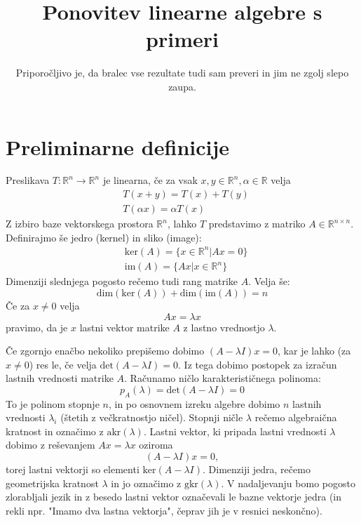 \documentclass{article}
\title{Ponovitev linearne algebre s primeri}
\date{Priporočljivo je, da bralec vse rezultate tudi sam preveri in jim ne zgolj slepo zaupa.}
\begin{document}
\maketitle
\section*{Preliminarne definicije}
Preslikava $T: \mathbb{R}^n \to \mathbb{R}^n$ je linearna, če za vsak $x,y \in \mathbb{R}^n, \alpha \in \mathbb{R}$ velja 
\begin{align*}
&T(x+y) = T(x)+T(y)\\
&T(\alpha x) = \alpha T(x)
\end{align*}
Z izbiro baze vektorskega prostora $\mathbb{R}^n$, lahko $T$ predstavimo z matriko $A \in \mathbb{R}^{n \times n}$.
Definirajmo še jedro (kernel) in sliko (image):
\begin{align*}
&\mathrm{ker}(A) = \{ x \in \mathbb{R}^n | Ax = 0\} \\
&\mathrm{im}(A) = \{ Ax | x \in \mathbb{R}^n\} 
\end{align*}
Dimenziji slednjega pogosto rečemo tudi rang matrike $A$. Velja še:
\begin{equation*}
\mathrm{dim}(\mathrm{ker}(A)) + \mathrm{dim}(\mathrm{im}(A)) = n
\end{equation*}
Če za $x \neq 0$ velja 
\begin{equation*}
Ax = \lambda x
\end{equation*}
pravimo, da je $x$ lastni vektor matrike $A$ z lastno vrednostjo $\lambda$.
\vspace{1em}

\noindent Če zgornjo enačbo nekoliko prepišemo dobimo $(A- \lambda I)x = 0$, kar je lahko (za $x \neq 0$) res le, če velja $\mathrm{det}(A - \lambda I) = 0$.
Iz tega dobimo postopek za izračun lastnih vrednosti matrike $A$. Računamo ničlo karakterističnega polinoma:
\begin{equation*}
p_A(\lambda) = \mathrm{det}(A-\lambda I) = 0
\end{equation*}
To je polinom stopnje $n$, in po osnovnem izreku algebre dobimo $n$ lastnih vrednosti $\lambda_i$ (štetih z večkratnostjo ničel).
Stopnji ničle $\lambda$ rečemo algebraična kratnost in označimo z $\mathrm{akr}(\lambda)$.
Lastni vektor, ki pripada lastni vrednosti $\lambda$ dobimo z reševanjem $Ax = \lambda x$ oziroma
\begin{equation*}
(A-\lambda I)x = 0,
\end{equation*}
torej lastni vektorji so elementi $\mathrm{ker}(A-\lambda I)$. Dimenziji jedra, rečemo geometrijska kratnost $\lambda$ in jo označimo z $\mathrm{gkr}(\lambda)$. V nadaljevanju bomo pogosto zlorabljali jezik in z besedo lastni vektor označevali le bazne vektorje jedra (in rekli npr. {}"Imamo dva lastna vektorja{}", čeprav jih je v resnici neskončno).
\end{document}
